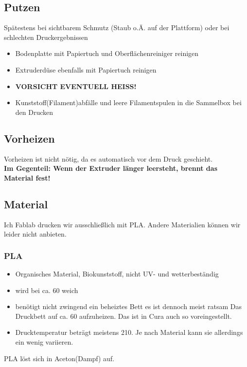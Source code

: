 \documentclass{\basedir/fablab-document}
\begin{document}
\subsection{Putzen} \label{putzen}

Spätestens bei sichtbarem Schmutz (Staub o.Ä. auf der Plattform) oder bei schlechten Druckergebnissen

\begin{itemize}
 \item Bodenplatte mit Papiertuch und Oberflächenreiniger reinigen
 \item Extruderdüse ebenfalls mit Papiertuch reinigen
 \item \textbf{VORSICHT EVENTUELL HEISS!}
 \item Kunststoff(Filament)abfälle und leere Filamentspulen in die Sammelbox bei den Drucken
\end{itemize}

\subsection{Vorheizen}
Vorheizen ist nicht nötig, da es automatisch vor dem Druck geschieht.\\
\textbf{Im Gegenteil: Wenn der Extruder länger leersteht, brennt das Material fest!}

\subsection{Material}
Ich Fablab drucken wir ausschließlich mit  PLA. Andere Materialien können wir leider nicht anbieten.
\subsubsection{PLA}
\begin{itemize}
\item Organisches Material, Biokunststoff, nicht UV- und wetterbeständig
\item wird bei ca. 60\textcelsius{} weich
\item benötigt nicht zwingend ein beheiztes Bett es ist dennoch meist ratsam Das Druckbett auf ca. 60\textcelsius{} aufzuheizen. Das ist in Cura auch so voreingestellt.
\item Drucktemperatur beträgt meistens 210\textcelsius{}. Je nach Material kann sie allerdings ein wenig variieren.
\end{itemize}

PLA löst sich in Aceton(Dampf) auf.
\end{document}
